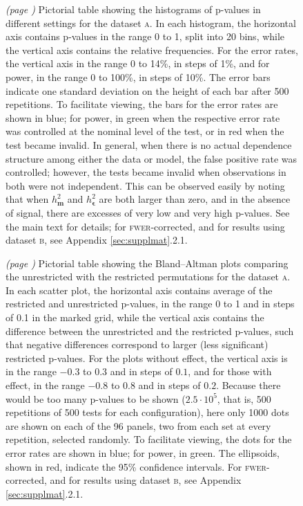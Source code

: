 \begin{figure}[!b]
\caption[Pictorial table showing histograms of p-values obtained in different settings.]{\emph{(page \pageref{fig:errorrates_noref})} Pictorial table showing the histograms of p-values in different settings for the dataset \textsc{a}. In each histogram, the horizontal axis contains p-values in the range 0 to 1, split into 20 bins, while the vertical axis contains the relative frequencies. For the error rates, the vertical axis in the range 0 to 14\%, in steps of 1\%, and for power, in the range 0 to 100\%, in steps of 10\%. The error bars indicate one standard deviation on the height of each bar after 500 repetitions. To facilitate viewing, the bars for the error rates are shown in blue; for power, in green when the respective error rate was controlled at the nominal level of the test, or in red when the test became invalid. In general, when there is no actual dependence structure among either the data or model, the false positive rate was controlled; however, the tests became invalid when observations in both were not independent. This can be observed easily by noting that when $h^2_{\mathbf{m}}$ and $h^2_{\boldsymbol{\epsilon}}$ are both larger than zero, and in the absence of signal, there are excesses of very low and very high p-values. See the main text for details; for \textsc{fwer}-corrected, and for results using dataset \textsc{b}, see Appendix \ref{sec:supplmat}.2.1.}
\label{fig:errorrates}
\end{figure}

\begin{figure}[!b]
\caption[Pictorial table showing the Bland--Altman plots comparing the permutation schemes.]{\emph{(page \pageref{fig:bland_altman_noref})} Pictorial table showing the Bland--Altman plots comparing the unrestricted with the restricted permutations for the dataset \textsc{a}. In each scatter plot, the horizontal axis contains average of the restricted and unrestricted p-values, in the range 0 to 1 and in steps of 0.1 in the marked grid, while the vertical axis contains the difference between the unrestricted and the restricted p-values, such that negative differences correspond to larger (less significant) restricted p-values. For the plots without effect, the vertical axis is in the range $-0.3$ to $0.3$ and in steps of $0.1$, and for those with effect, in the range $-0.8$ to $0.8$ and in steps of $0.2$. Because there would be too many p-values to be shown ($2.5\cdot 10^{5}$, that is, 500 repetitions of 500 tests for each configuration), here only 1000 dots are shown on each of the 96 panels, two from each set at every repetition, selected randomly. To facilitate viewing, the dots for the error rates are shown in blue; for power, in green. The ellipsoids, shown in red, indicate the 95\% confidence intervals. For \textsc{fwer}-corrected, and for results using dataset \textsc{b}, see Appendix \ref{sec:supplmat}.2.1.}
\label{fig:bland_altman}
\end{figure}

